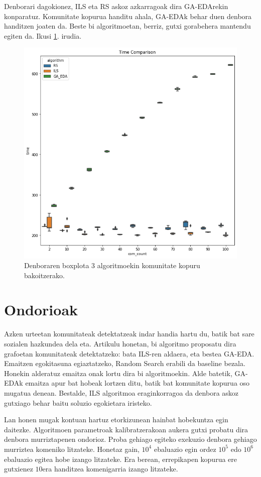 \documentclass[sigconf]{acmart}
\begin{document}
Denborari dagokionez, ILS eta RS askoz azkarragoak dira GA-EDArekin konparatuz. Komunitate kopurua handitu ahala, GA-EDAk behar duen denbora handitzen joaten da. Beste bi algoritmoetan, berriz, gutxi gorabehera mantendu egiten da. Ikusi \ref{fig:boxplot_time}. irudia.

\begin{figure}
    \centering
    \includegraphics[width=1\linewidth]{boxplot_time}
    \caption{Denboraren boxplota 3 algoritmoekin komunitate kopuru bakoitzerako.}
    \label{fig:boxplot_time}
\end{figure}

\section{Ondorioak}
Azken urteetan komunitateak detektatzeak indar handia hartu du, batik bat sare sozialen hazkundea dela eta. Artikulu honetan, bi algoritmo proposatu dira grafoetan komunitateak detektatzeko: bata ILS-ren aldaera, eta bestea GA-EDA. Emaitzen egokitasuna egiaztatzeko, Random Search erabili da baseline bezala. Honekin alderatuz emaitza onak lortu dira bi algoritmoekin. Alde batetik, GA-EDAk emaitza apur bat hobeak lortzen ditu, batik bat komunitate kopurua oso mugatua denean. Bestalde, ILS algoritmoa eraginkorragoa da denbora askoz gutxiago behar baitu soluzio egokietara iristeko.

Lan honen mugak kontuan hartuz etorkizunean hainbat hobekuntza egin daitezke. Algoritmoen parametroak kalibratzerakoan aukera gutxi probatu dira denbora murriztapenen ondorioz. Proba gehiago egiteko exekuzio denbora gehiago murriztea komeniko litzateke. Honetaz gain, $10^4$ ebaluazio egin ordez $10^5$ edo $10^6$ ebaluazio egitea hobe izango litzateke. Era berean, errepikapen kopurua ere gutxienez $10$era handitzea komenigarria izango litzateke.



\end{document}
